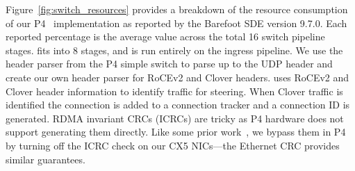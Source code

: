 Figure~\ref{fig:switch_resources} provides a breakdown of the resource
consumption of our P4 \sword\ implementation as reported by
the Barefoot SDE version 9.7.0. Each
reported percentage is the average value across the total 16 switch
pipeline stages. {\sword} fits into 8 stages, and is run entirely on
the ingress pipeline.
We use the header parser from the P4 simple switch to parse up to the
UDP header and create our own header parser for RoCEv2 and Clover
headers.  {\sword} uses RoCEv2 and Clover header information to
identify traffic for steering. When Clover traffic is identified the
connection is added to a connection tracker and a connection ID is
generated. RDMA invariant CRCs (ICRCs) are tricky as P4 hardware does
not support generating them directly. Like some prior
work~\cite{switchml}, we bypass them in P4 by turning off the ICRC
check on our CX5 NICs---the Ethernet CRC provides similar guarantees.






